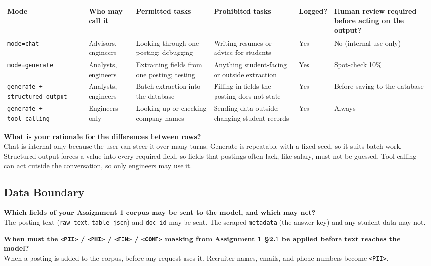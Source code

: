 \documentclass[11pt]{article}
\newcommand{\q}[1]{\par\noindent\textbf{#1}\\}
\begin{document}
\begin{table}[H]
\centering
\footnotesize
\renewcommand{\arraystretch}{1.3}
\begin{tabularx}{\textwidth}{L{2.9cm} L{1.6cm} X X L{1.3cm} X}
\toprule
\textbf{Mode} & \textbf{Who may call it} & \textbf{Permitted tasks} & \textbf{Prohibited tasks} & \textbf{Logged?} & \textbf{Human review required before acting on the output?} \\
\midrule
\texttt{mode=chat} & Advisors, engineers & Looking through one posting; debugging & Writing resumes or advice for students & Yes & No (internal use only) \\
\addlinespace
\texttt{mode=generate} & Analysts, engineers & Extracting fields from one posting; testing & Anything student-facing or outside extraction & Yes & Spot-check 10\% \\
\addlinespace
\texttt{generate +} \texttt{structured\_output} & Analysts, engineers & Batch extraction into the database & Filling in fields the posting does not state & Yes & Before saving to the database \\
\addlinespace
\texttt{generate +} \texttt{tool\_calling} & Engineers only & Looking up or checking company names & Sending data outside; changing student records & Yes & Always \\
\bottomrule
\end{tabularx}
\end{table}

\q{What is your rationale for the differences between rows?}
Chat is internal only because the user can steer it over many turns. Generate is repeatable with a fixed seed, so it suits batch work. Structured output forces a value into every required field, so fields that postings often lack, like salary, must not be guessed. Tool calling can act outside the conversation, so only engineers may use it.

\subsection{Data Boundary}

\q{Which fields of your Assignment 1 corpus may be sent to the model, and which may not?}
The posting text (\texttt{raw\_text}, \texttt{table\_json}) and \texttt{doc\_id} may be sent. The scraped \texttt{metadata} (the answer key) and any student data may not.

\q{When must the \texttt{<PII>} / \texttt{<PHI>} / \texttt{<FIN>} / \texttt{<CONF>} masking from Assignment 1 §2.1 be applied before text reaches the model?}
When a posting is added to the corpus, before any request uses it. Recruiter names, emails, and phone numbers become \texttt{<PII>}.
\end{document}
